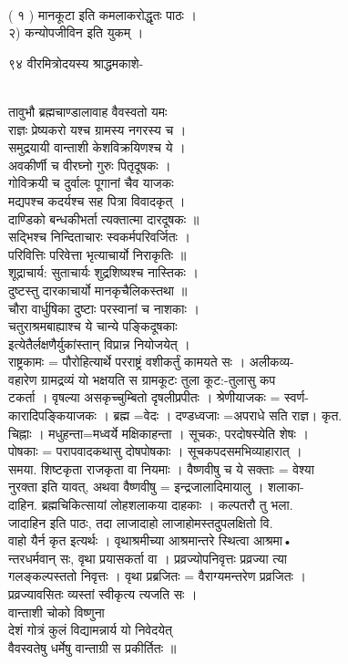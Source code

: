 \documentclass[11pt, openany]{book}
\begin{document}
{{{\\
( १ ) मानकूटा इति कमलाकरोद्धृतः पाठः ।\\
२) कन्योपजीविन इति युकम् ।

{९४ }{ वीरमित्रोदयस्य श्राद्धमकाशे-}{\\
तावुभौ ब्रह्मचाण्डालावाह वैवस्वतो यमः \textbar{}\textbar{}\\
राज्ञः प्रेष्यकरो यश्च ग्रामस्य नगरस्य च ।\\
समुद्रयायी वान्ताशी केशविक्रयिणश्च ये ।\\
अवकीर्णी च वीरघ्नो गुरुः पितृदूषकः ।\\
गोविक्रयी च दुर्वालः पूगानां चैव याजकः \textbar{}\textbar{}\\
मद्यपश्च कदर्यश्च सह पित्रा विवादकृत् ।\\
दाण्डिको बन्धकीभर्ता त्यक्तात्मा दारदूषकः ॥\\
सद्भिश्च निन्दिताचारः स्वकर्मपरिवर्जितः ।\\
परिवित्तिः परिवेत्ता भृत्याचार्यो निराकृतिः ॥\\
शूद्राचार्य: सुताचार्यः शुद्रशिष्यश्च नास्तिकः ।\\
दुष्टस्तु दारकाचार्यो मानकृचैलिकस्तथा ॥\\
चौरा वार्धुषिका दुष्टाः परस्वानां च नाशकाः ।\\
चतुराश्रमबाह्याश्च ये चान्ये पङ्किदूषकाः \textbar{}\textbar{}\\
इत्येतैर्लक्षणैर्युकांस्तान् विप्रान्न नियोजयेत् ।\\
राष्ट्रकामः = पौरोहित्यार्थे परराष्ट्रं वशीकर्तुं कामयते सः । अलीकव्य-\\
वहारेण ग्रामद्रव्यं यो भक्षयति स ग्रामकूटः \textbar{} तुला कूट:-तुलासु
कप\\
टकर्ता । वृषल्या असकृच्चुम्बितो दृषलीप्रपीतः । श्रेणीयाजकः = स्वर्ण-\\
कारादिपङ्कियाजकः । ब्रह्म =वेदः । दण्डध्वजाः =अपराधे सति राज्ञ। कृत.\\
चिह्नाः । मधुहन्ता=मध्वर्ये मक्षिकाहन्ता । सूचकः, परदोषस्येति शेषः ।\\
पोषकाः = परापवादकथासु दोषपोषकाः । सूचकपदसमभिव्याहारात् ।\\
समया. शिष्टकृता राजकृता वा नियमाः । वैष्णवीषु च ये सक्ताः = वेश्या\\
नुरक्ता इति यावत्, अथवा वैष्णवीषु = इन्द्रजालादिमायालु । शलाका-\\
दाहिन. ब्रह्मचिकित्सायां लोहशलाकया दाहकाः । कल्पतरौ तु भला.\\
जादाहिन इति पाठः, तदा लाजादाहो लाजाहोमस्तदुपलक्षितो वि.\\
वाहो यैर्न कृत इत्यर्थः । वृथाश्रमीच्या आश्रमान्तरे स्थित्वा आश्रमा•\\
न्तरधर्मवान् सः, वृथा प्रयासकर्ता वा । प्रव्रज्योपनिवृत्तः प्रव्रज्या
त्या\\
गलङ्कल्पस्ततो निवृत्तः । वृथा प्रब्रजितः = वैराग्यमन्तरेण प्रव्रजितः ।\\
प्रव्रज्यावसितः व्यस्तां स्वीकृत्य त्यजति सः ।\\
वान्ताशी चोको विष्णुना\\
देशं गोत्रं कुलं विद्यामन्नार्य यो निवेदयेत् \textbar{}\\
वैवस्वतेषु धर्मेषु वान्ताग्री स प्रकीर्तितः ॥

}}}}
\end{document}
